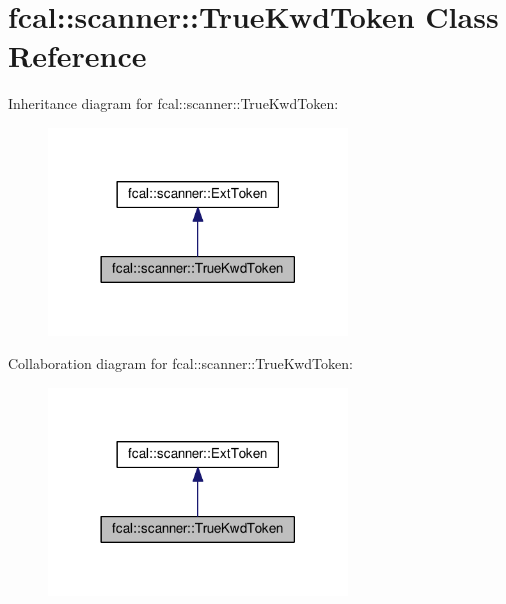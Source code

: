 \hypertarget{classfcal_1_1scanner_1_1TrueKwdToken}{}\section{fcal\+:\+:scanner\+:\+:True\+Kwd\+Token Class Reference}
\label{classfcal_1_1scanner_1_1TrueKwdToken}


Inheritance diagram for fcal\+:\+:scanner\+:\+:True\+Kwd\+Token\+:
\nopagebreak
\begin{figure}[H]
\begin{center}
\leavevmode
\includegraphics[width=225pt]{classfcal_1_1scanner_1_1TrueKwdToken__inherit__graph}
\end{center}
\end{figure}


Collaboration diagram for fcal\+:\+:scanner\+:\+:True\+Kwd\+Token\+:
\nopagebreak
\begin{figure}[H]
\begin{center}
\leavevmode
\includegraphics[width=225pt]{classfcal_1_1scanner_1_1TrueKwdToken__coll__graph}
\end{center}
\end{figure}
